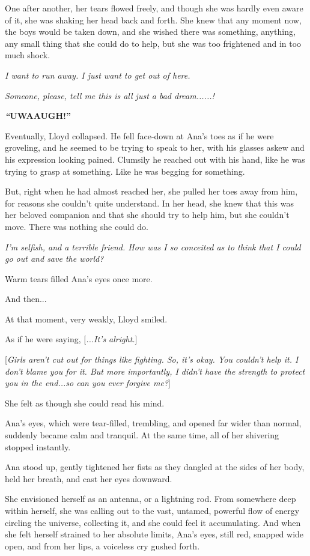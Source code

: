 \documentclass[
]{article}
\begin{document}
One after another, her tears flowed freely, and though she was hardly
even aware of it, she was shaking her head back and forth. She knew that
any moment now, the boys would be taken down, and she wished there was
something, anything, any small thing that she could do to help, but she
was too frightened and in too much shock.

\emph{I want to run away. I just want to get out of here.}

\emph{Someone, please, tell me this is all just a bad dream......!}

\emph{\textbf{``}}\textbf{UWAAUGH!''}

Eventually, Lloyd collapsed. He fell face-down at Ana's toes as if he
were groveling, and he seemed to be trying to speak to her, with his
glasses askew and his expression looking pained. Clumsily he reached out
with his hand, like he was trying to grasp at something. Like he was
begging for something.

But, right when he had almost reached her, she pulled her toes away from
him, for reasons she couldn't quite understand. In her head, she knew
that this was her beloved companion and that she should try to help him,
but she couldn't move. There was nothing she could do.

\emph{I'm selfish, and a terrible friend. How was I so conceited as to
think that I could go out and save the world?}

Warm tears filled Ana's eyes once more.

And then...

At that moment, very weakly, Lloyd smiled.

As if he were saying, {[}\emph{...It's alright.}{]}

{[}\emph{Girls aren't cut out for things like fighting. So, it's okay.
You couldn't help it. I don't blame you for it. But more importantly, I
didn't have the strength to protect you in the end...so can you ever
forgive me?}{]}

She felt as though she could read his mind.

Ana's eyes, which were tear-filled, trembling, and opened far wider than
normal, suddenly became calm and tranquil. At the same time, all of her
shivering stopped instantly.

Ana stood up, gently tightened her fists as they dangled at the sides of
her body, held her breath, and cast her eyes downward.

She envisioned herself as an antenna, or a lightning rod. From somewhere
deep within herself, she was calling out to the vast, untamed, powerful
flow of energy circling the universe, collecting it, and she could feel
it accumulating. And when she felt herself strained to her absolute
limits, Ana's eyes, still red, snapped wide open, and from her lips, a
voiceless cry gushed forth.
\end{document}
